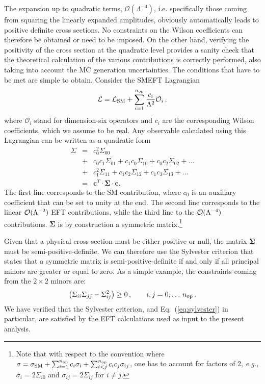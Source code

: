 The expansion up to quadratic terms, $\mathcal{O}(\Lambda^{-4})$,
i.e. specifically those coming from squaring the 
linearly expanded amplitudes, obviously automatically leads to positive definite cross sections. No constraints
on the Wilson coefficients can therefore be obtained or need to be imposed.
%
On the other hand, verifying
the positivity of the cross section at the quadratic level provides a sanity check that the theoretical calculation  of the various contributions is correctly performed,
also taking into account the MC generation uncertainties.
%
The conditions that have to be  met are simple to obtain. 
%
Consider the  SMEFT Lagrangian
\begin{equation}
\mathcal{L} =   \mathcal{L}_{\rm SM}  + \sum^{ n_{\rm op}}_{i=1} \frac{c_i}{\Lambda^2}\mathcal{O}_i \,,
\end{equation}
where $\mathcal{O}_i$ stand for dimension-six operators and $c_i$ are the
corresponding Wilson coefficients, which we assume to be real. 
%
Any observable calculated using this Lagrangian can be written as a quadratic form
\begin{eqnarray}
\Sigma&=&c_0^2 \Sigma_{00} \nonumber \\
 &+&c_0 c_1 \Sigma_{01} + c_1 c_0 \Sigma_{10}  +  c_0 c_2 \Sigma_{02} +\dots \nonumber \\
 &+&c_1^2 \Sigma_{11} + c_1 c_2 \Sigma_{12} +  c_1 c_3 \Sigma_{13} + \ldots \nonumber \\
&=& {\boldsymbol c^T} \cdot  \boldsymbol{\Sigma} \cdot {\boldsymbol c}. 
\end{eqnarray}
The first line corresponds to the SM contribution, where $c_0$ is an auxiliary coefficient that can be set to unity at the end.  The second line corresponds to the linear ${\cal O}(\Lambda^{-2})$ EFT contributions, while the third line to the ${\cal O}(\Lambda^{-4})$ contributions.
%
$\boldsymbol{\Sigma}$ is by construction a symmetric matrix.\footnote{Note that with respect to
  the convention where $\sigma= \sigma_{\rm SM} + \sum^{n_{\rm op}}_{i=1} c_i \sigma_i  + \sum^{n_{\rm op}}_{i<j} c_i c_j \sigma_{ij}$, one has to account for factors of 2, {\it e.g.}, $\sigma_i=2 \Sigma_{i0}$ and $\sigma_{ij}=2 \Sigma_{ij}$ for $i\neq  j$.}

Given that a physical cross-section must be either positive or null,
the matrix $\boldsymbol{\Sigma}$ must be semi-positive-definite.
%
We can therefore use the Sylvester criterion that states that a symmetric matrix is semi-positive-definite if and only if all principal minors are greater or equal to zero. As a simple example, the constraints coming from the $2\times 2$ minors are:
\begin{equation}
  \label{eq:sylvester}
  \lp \Sigma_{ii}\Sigma_{jj} - \Sigma_{ij}^2 \rp   \ge 0 \, , \qquad i,j=0,\ldots\, n_{\rm op}\,.
\end{equation}
We have verified that the Sylvester criterion, and Eq.~(\ref{eq:sylvester}) in particular,
are satisfied by the EFT calculations used as input to the present analysis.


